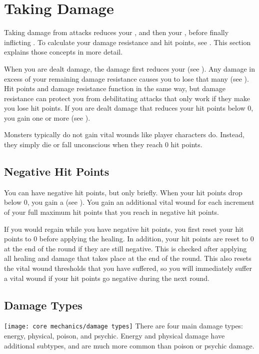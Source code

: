 \section{Taking Damage}\label{Taking Damage}
    Taking damage from attacks reduces your , and then your , before finally inflicting .
    To calculate your damage resistance and hit points, see .
    This section explains those concepts in more detail.

    When you are dealt damage, the damage first reduces your  (see ).
    Any damage in excess of your remaining damage resistance causes you to lose that many  (see ).
    Hit points and damage resistance function in the same way, but damage resistance can protect you from debilitating attacks that only work if they make you lose hit points.
    If you are dealt damage that reduces your hit points below 0, you gain one or more  (see ).

    Monsters typically do not gain vital wounds like player characters do.
    Instead, they simply die or fall unconscious when they reach 0 hit points.

    \subsection{Negative Hit Points}\label{Negative Hit Points}
        You can have negative hit points, but only briefly.
        When your hit points drop below 0, you gain a  (see ).
        You gain an additional vital wound for each increment of your full maximum hit points that you reach in negative hit points.

        If you would regain  while you have negative hit points, you first reset your hit points to 0 before applying the healing.
        In addition, your hit points are reset to 0 at the end of the round if they are still negative.
        This is checked after applying all healing and damage that takes place at the end of the round.
        This also resets the vital wound thresholds that you have suffered, so you will immediately suffer a vital wound if your hit points go negative during the next round.

    \subsection{Damage Types}\label{Damage Types}
        \texttt{[image: core mechanics/damage types]}
        There are four main damage types: energy, physical, poison, and psychic.
        Energy and physical damage have additional subtypes, and are much more common than poison or psychic damage.

